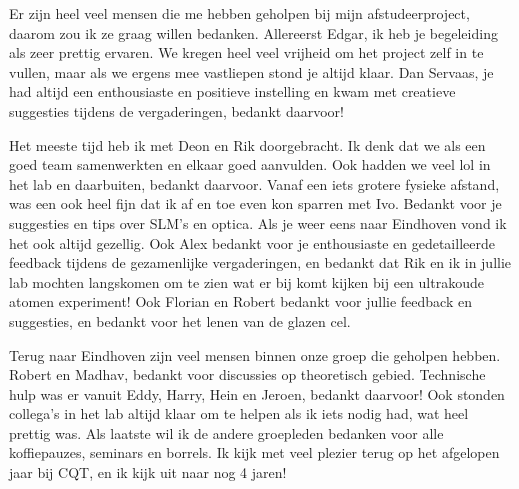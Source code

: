 \noindent Er zijn heel veel mensen die me hebben geholpen bij mijn afstudeerproject, daarom zou ik ze graag willen bedanken. 
Allereerst Edgar, ik heb je begeleiding als zeer prettig ervaren. 
We kregen heel veel vrijheid om het project zelf in te vullen, maar als we ergens mee vastliepen stond je altijd klaar.
Dan Servaas, je had altijd een enthousiaste en positieve instelling en kwam met creatieve suggesties tijdens de vergaderingen, bedankt daarvoor!

Het meeste tijd heb ik met Deon en Rik doorgebracht. 
Ik denk dat we als een goed team samenwerkten en elkaar goed aanvulden.
Ook hadden we veel lol in het lab en daarbuiten, bedankt daarvoor. 
Vanaf een iets grotere fysieke afstand, was een ook heel fijn dat ik af en toe even kon sparren met Ivo. 
Bedankt voor je suggesties en tips over SLM's en optica. Als je weer eens naar Eindhoven vond ik het ook altijd gezellig.
Ook Alex bedankt voor je enthousiaste en gedetailleerde feedback tijdens de gezamenlijke vergaderingen, en bedankt dat Rik en ik in jullie lab mochten langskomen om te zien wat er bij komt kijken bij een ultrakoude atomen experiment!
Ook Florian en Robert bedankt voor jullie feedback en suggesties, en bedankt voor het lenen van de glazen cel.

Terug naar Eindhoven zijn veel mensen binnen onze groep die geholpen hebben. 
Robert en Madhav, bedankt voor discussies op theoretisch gebied. 
Technische hulp was er vanuit Eddy, Harry, Hein en Jeroen, bedankt daarvoor! 
Ook stonden collega's in het lab altijd klaar om te helpen als ik iets nodig had, wat heel prettig was.
Als laatste wil ik de andere groepleden bedanken voor alle koffiepauzes, seminars en borrels. 
Ik kijk met veel plezier terug op het afgelopen jaar bij CQT, en ik kijk uit naar nog 4 jaren!
